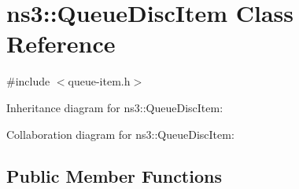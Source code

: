 \hypertarget{classns3_1_1QueueDiscItem}{}\section{ns3\+:\+:Queue\+Disc\+Item Class Reference}
\label{classns3_1_1QueueDiscItem}


{\ttfamily \#include $<$queue-\/item.\+h$>$}



Inheritance diagram for ns3\+:\+:Queue\+Disc\+Item\+:


Collaboration diagram for ns3\+:\+:Queue\+Disc\+Item\+:
\subsection*{Public Member Functions}
